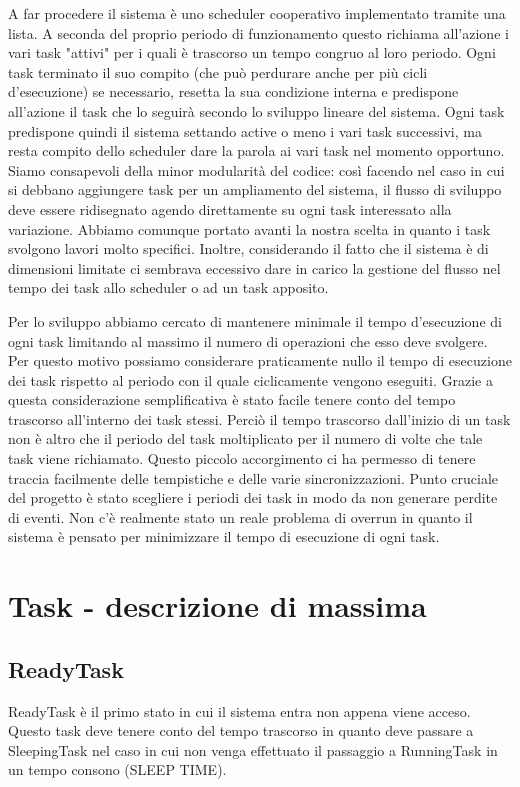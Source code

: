 \documentclass[a4paper,12pt]{report}
\begin{document}
A far procedere il sistema è uno scheduler cooperativo implementato tramite una lista. A seconda del proprio periodo di funzionamento questo richiama all'azione i vari task "attivi" per i quali è trascorso un tempo congruo al loro periodo.
Ogni task terminato il suo compito (che può perdurare anche per più cicli d'esecuzione) se necessario, resetta la sua condizione interna e predispone all'azione il task che lo seguirà secondo lo sviluppo lineare del sistema.
Ogni task predispone quindi il sistema settando active o meno i vari task successivi, ma resta compito dello scheduler dare la parola ai vari task nel momento opportuno.
Siamo consapevoli della minor modularità del codice: così facendo nel caso in cui si debbano aggiungere task per un ampliamento del sistema, il flusso di sviluppo deve essere ridisegnato agendo direttamente su ogni task interessato alla variazione.
Abbiamo comunque portato avanti la nostra scelta in quanto i task svolgono lavori molto specifici. Inoltre, considerando il fatto che il sistema è di dimensioni limitate ci sembrava eccessivo dare in carico la gestione del flusso nel tempo dei task allo scheduler o ad un task apposito.

Per lo sviluppo abbiamo cercato di mantenere minimale il tempo d'esecuzione di ogni task limitando al massimo il numero di operazioni che esso deve svolgere. Per questo motivo possiamo considerare praticamente nullo il tempo di esecuzione dei task rispetto al periodo con il quale ciclicamente vengono eseguiti. Grazie a questa considerazione semplificativa è stato facile tenere conto del tempo trascorso all'interno dei task stessi. Perciò il tempo trascorso dall'inizio di un task non è altro che il periodo del task moltiplicato per il numero di volte che tale task viene richiamato. Questo piccolo accorgimento ci ha permesso di tenere traccia facilmente delle tempistiche e delle varie sincronizzazioni.
Punto cruciale del progetto è stato scegliere i periodi dei task in modo da non generare perdite di eventi.
Non c'è realmente stato un reale problema di overrun in quanto il sistema è pensato per minimizzare il tempo di esecuzione di ogni task.

\chapter{Task - descrizione di massima}
\section{ReadyTask}
ReadyTask è il primo stato in cui il sistema entra non appena viene acceso. 
Questo task deve tenere conto del tempo trascorso in quanto deve passare a SleepingTask nel caso in cui non venga effettuato il passaggio a RunningTask in un tempo consono (SLEEP TIME).
\end{document}
